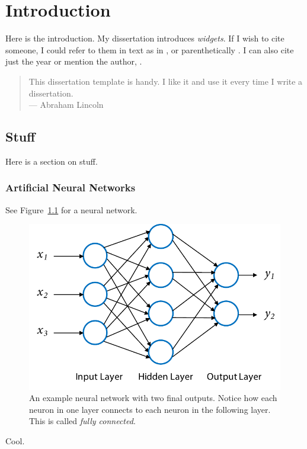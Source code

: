 \chapter{Introduction}

Here is the introduction. My dissertation introduces \emph{widgets}. If I wish
to cite someone, I could refer to them in text as in \citet{Pedersen:2001p6983},
or parenthetically \citep{Pedersen:2001p6983}. I can also cite just the
year \citeyearpar{Pedersen:2001p6983} or mention the author,
\citeauthor{Pedersen:2001p6983}.


\begin{quote}
This dissertation template is handy. I like it and use it every time I write a
dissertation.\\
\hspace*{\fill} --- Abraham Lincoln \citeyearpar{Pedersen:2001p6983}
\end{quote}


\section{Stuff}
\label{sec:stuff}

Here is a section on stuff.

\subsection{Artificial Neural Networks}
\label{sec:neuralnet}

See Figure~\ref{fig:neuralnet} for a neural network.

\begin{figure}[th]
	\begin{center}
	   \includegraphics[width=0.8\linewidth]{figures/neuralnet}
	\end{center}
	\caption[An example neural network with two final outputs]
		{An example neural network with two final outputs. Notice how each
		neuron in one layer connects to each neuron in the following layer. This
		is called \emph{fully connected}.}
	\label{fig:neuralnet}
\end{figure}

Cool.
